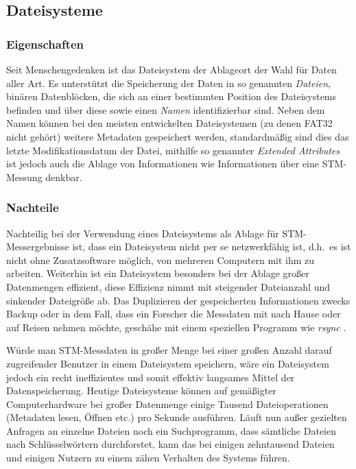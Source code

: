 \documentclass[12pt,ngerman,a4]{scrartcl}
\newcommand{\pquote}[1]{\glqq #1\grqq}
\begin{document}
\subsection{Dateisysteme}
\subsubsection{Eigenschaften}
Seit Menschengedenken ist das Dateisystem der Ablageort der Wahl für Daten aller Art. Es unterstützt die Speicherung der Daten in so genannten \emph{Dateien}, binären Datenblöcken, die sich an einer bestimmten Position des Dateisystems befinden und über diese sowie einen \emph{Namen} identifizierbar sind. Neben dem Namen können bei den meisten entwickelten Dateisystemen (zu denen FAT32 nicht gehört) weitere Metadaten gespeichert werden, standardmäßig sind dies das letzte Modifikationsdatum der Datei, mithilfe so genannter \emph{Extended Attributes} ist jedoch auch die Ablage von Informationen wie Informationen über eine STM-Messung denkbar.
\subsubsection{Nachteile}
Nachteilig bei der Verwendung eines Dateisystems als Ablage für STM-\linebreak Messergebnisse ist, dass ein Dateisystem nicht per se netzwerkfähig ist, d.h.\ es ist nicht ohne Zusatzsoftware möglich, von mehreren Computern mit ihm zu arbeiten. Weiterhin ist ein Dateisystem besonders bei der Ablage großer Datenmengen effizient, diese Effizienz nimmt mit steigender Dateianzahl und sinkender Dateigröße ab. Das Duplizieren der gespeicherten Informationen zwecks Backup oder in dem Fall, dass ein Forscher die Messdaten mit nach Hause oder auf Reisen nehmen möchte, geschähe mit einem speziellen Programm wie \emph{rsync} \cite{manrsync}.

Würde man STM-Messdaten in großer Menge bei einer großen Anzahl darauf zugreifender Benutzer in einem Dateisystem speichern, wäre ein Dateisystem jedoch ein recht ineffizientes und somit effektiv langsames Mittel der Datenspeicherung. Heutige Dateisysteme können auf gemäßigter Computerhardware bei großer Datenmenge einige Tausend Dateioperationen (Metadaten lesen, Öffnen etc.) pro Sekunde ausführen. %
Läuft nun außer gezielten Anfragen an einzelne Dateien noch ein Suchprogramm, %
dass sämtliche Dateien nach Schlüsselwörtern durchforstet, kann das bei einigen zehntausend Dateien und einigen Nutzern zu einem \pquote{zähen} Verhalten des Systems führen.
\end{document}
